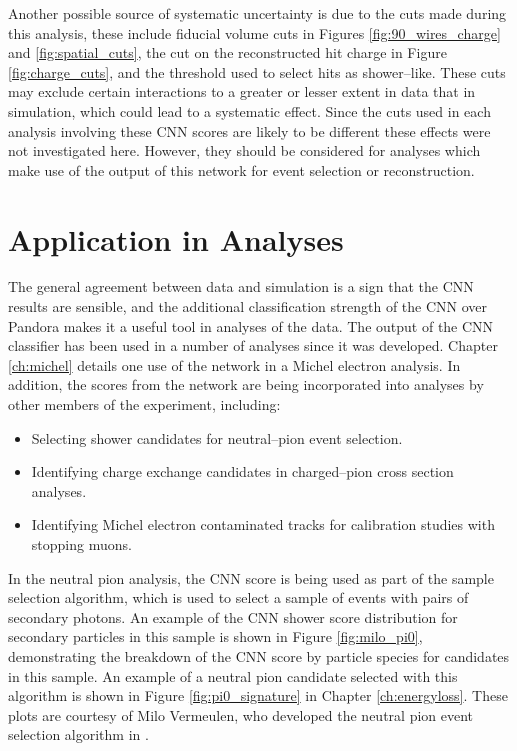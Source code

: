 Another possible source of systematic uncertainty is due to the cuts made during
this analysis, these include fiducial volume cuts in Figures 
\ref{fig:90_wires_charge} and \ref{fig:spatial_cuts}, the cut on the 
reconstructed hit charge in Figure \ref{fig:charge_cuts}, and the threshold used
to select hits as shower--like. These cuts may exclude certain interactions to a
greater or lesser extent in data that in simulation, which could lead to a 
systematic effect. Since the cuts used in each analysis involving these CNN 
scores are likely to be different these effects were not investigated here. 
However, they should be considered for analyses which make use of the output 
of this network for event selection or reconstruction.

\section{Application in \protodune{} Analyses} \label{cnn-appl}
The general agreement between data and simulation is a sign that the CNN results
are sensible, and the additional classification strength of the CNN over
Pandora makes it a useful tool in analyses of the \protodune{} data. The 
output of the CNN classifier has been used in a number of \protodune{} 
analyses since it was developed. Chapter \ref{ch:michel} details one use of 
the network in a Michel electron analysis. In addition, the scores from the 
network are being incorporated into analyses by other members of the 
\protodune{} experiment, including:
\begin{itemize}
	\item Selecting shower candidates for neutral--pion event selection\cite{pi_0}.
	\item Identifying charge exchange candidates in charged--pion cross section 
		analyses\cite{pion_exchange}.
	\item Identifying Michel electron contaminated tracks for calibration studies
		with stopping muons\cite{fabio_muon}.
\end{itemize}

\noindent
In the neutral pion analysis, the CNN score is being used as part of the 
sample selection algorithm, which is used to select a sample of events with
pairs of secondary photons. An example of the CNN shower score distribution for
secondary particles in this sample is shown in Figure \ref{fig:milo_pi0}, 
demonstrating the breakdown of the CNN score by particle species for candidates
in this sample. An example of a neutral pion candidate selected with this
algorithm is shown in Figure \ref{fig:pi0_signature} in Chapter 
\ref{ch:energyloss}. These plots are courtesy of Milo Vermeulen, who 
developed the neutral pion event selection algorithm in \protodune{}\cite{pi_0}.

